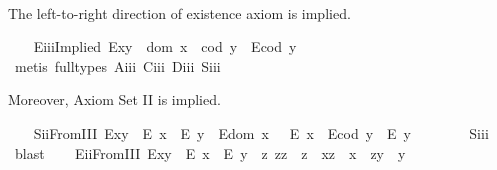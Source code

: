 \begin{isabellebody}
\isadelimproof
\ %
\endisadelimproof
%
\isatagproof
{}\isamarkupfalse%
%
\endisatagproof
{\isafoldproof}%
%
\isadelimproof
%
\endisadelimproof
%
\begin{isamarkuptext}%
The left-to-right direction of existence axiom  is implied.%
\end{isamarkuptext}\isamarkuptrue%
\ \ \isamarkupfalse%
\ E\isactrlsub i\isactrlsub i\isactrlsub iImplied{\isacharcolon}\ {\isachardoublequoteopen}E{\isacharparenleft}x{\isasymcdot}y{\isacharparenright}\ \isactrlbold {\isasymrightarrow}\ {\isacharparenleft}dom\ x\ {\isasymcong}\ cod\ y\ \isactrlbold {\isasymand}\ E{\isacharparenleft}cod\ y{\isacharparenright}{\isacharparenright}{\isachardoublequoteclose}\ \isanewline
%
\isadelimproof
\ \ \ \ %
\endisadelimproof
%
\isatagproof
{}\isamarkupfalse%
\ {\isacharparenleft}metis\ {\isacharparenleft}full{\isacharunderscore}types{\isacharparenright}\ A\isactrlsub i\isactrlsub i\isactrlsub i\ C\isactrlsub i\isactrlsub i\isactrlsub i\ D\isactrlsub i\isactrlsub i\isactrlsub i\ S\isactrlsub i\isactrlsub i\isactrlsub i{\isacharparenright}%
\endisatagproof
{\isafoldproof}%
%
\isadelimproof
%
\endisadelimproof
%
\begin{isamarkuptext}%
Moreover, Axiom Set II is implied.%
\end{isamarkuptext}\isamarkuptrue%
\ \ \isamarkupfalse%
\ S\isactrlsub i\isactrlsub iFromIII{\isacharcolon}\ {\isachardoublequoteopen}{\isacharparenleft}E{\isacharparenleft}x{\isasymcdot}y{\isacharparenright}\ \isactrlbold {\isasymrightarrow}\ {\isacharparenleft}E\ x\ \isactrlbold {\isasymand}\ E\ y{\isacharparenright}{\isacharparenright}\ \isactrlbold {\isasymand}\ {\isacharparenleft}E{\isacharparenleft}dom\ x\ {\isacharparenright}\ \isactrlbold {\isasymrightarrow}\ E\ x{\isacharparenright}\ \isactrlbold {\isasymand}\ {\isacharparenleft}E{\isacharparenleft}cod\ y{\isacharparenright}\ \isactrlbold {\isasymrightarrow}\ E\ y{\isacharparenright}{\isachardoublequoteclose}\ \ \isanewline
%
\isadelimproof
\ \ \ \ %
\endisadelimproof
%
\isatagproof
{}\isamarkupfalse%
\ S\isactrlsub i\isactrlsub i\isactrlsub i\ \isamarkupfalse%
\ blast%
\endisatagproof
{\isafoldproof}%
%
\isadelimproof
\isanewline
%
\endisadelimproof
\ \ \isamarkupfalse%
\ E\isactrlsub i\isactrlsub iFromIII{\isacharcolon}\ {\isachardoublequoteopen}E{\isacharparenleft}x{\isasymcdot}y{\isacharparenright}\ \isactrlbold {\isasymleftarrow}\ {\isacharparenleft}E\ x\ \isactrlbold {\isasymand}\ E\ y\ \isactrlbold {\isasymand}\ {\isacharparenleft}\isactrlbold {\isasymexists}z{\isachardot}\ z{\isasymcdot}z\ {\isasymcong}\ z\ \isactrlbold {\isasymand}\ x{\isasymcdot}z\ {\isasymcong}\ x\ \isactrlbold {\isasymand}\ z{\isasymcdot}y\ {\isasymcong}\ y{\isacharparenright}{\isacharparenright}{\isachardoublequoteclose}\ \isanewline

\end{isabellebody}
